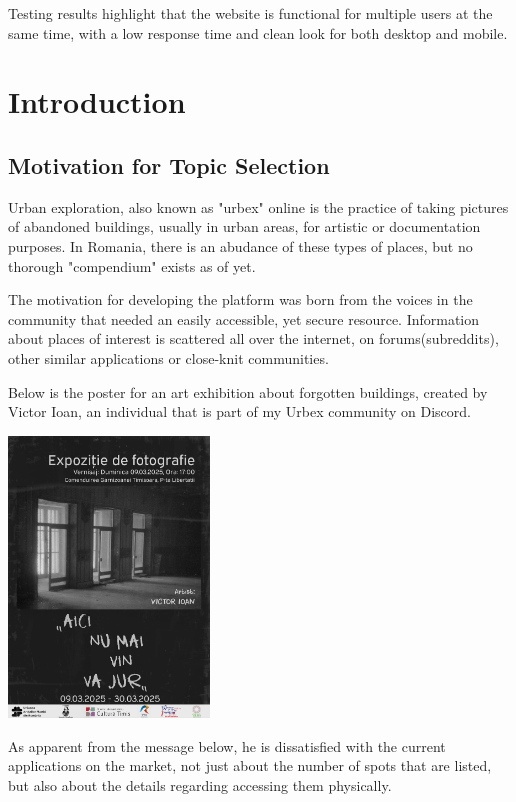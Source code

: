 \documentclass[12pt,a4paper]{report}
\begin{document}
Testing results highlight that the website is functional for multiple users at the same time, with a low response time and clean look for both desktop and mobile.

\newpage

\chapter*{Introduction}

\section*{Motivation for Topic Selection}

Urban exploration, also known as "urbex" online is the practice of taking pictures of abandoned buildings, usually in urban areas, for artistic or documentation purposes. In Romania, there is an abudance of these types of places, but no thorough "compendium" exists as of yet.

The motivation for developing the platform was born from the voices in the community that needed an easily accessible, yet secure resource. Information about places of interest is scattered all over the internet, on forums(subreddits), other similar applications or close-knit communities.

Below is the poster for an art exhibition about forgotten buildings, created by Victor Ioan, an individual that is part of my Urbex community on Discord.

\begin{center}
\includegraphics[width=0.4\textwidth]{images/expozitie.jpg}
\end{center}

As apparent from the message below, he is dissatisfied with the current applications on the market, not just about the number of spots that are listed, but also about the details regarding accessing them physically.
\end{document}
